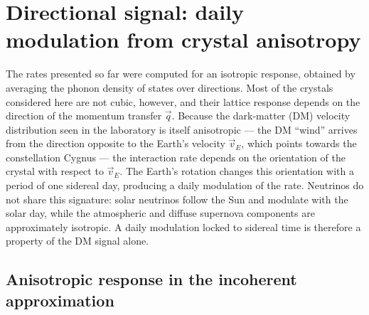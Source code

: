 
\section{Directional signal: daily modulation from crystal anisotropy}
\label{sec:directionality}

The rates presented so far were computed for an isotropic response, obtained by
averaging the phonon density of states over directions. Most of the crystals
considered here are not cubic, however, and their lattice response depends on the
direction of the momentum transfer $\vec q$. Because the dark-matter (DM) velocity
distribution seen in the laboratory is itself anisotropic --- the DM ``wind'' arrives
from the direction opposite to the Earth's velocity $\vec v_E$, which points towards the
constellation Cygnus --- the interaction rate depends on the orientation of the crystal
with respect to $\vec v_E$. The Earth's rotation changes this orientation with a period
of one sidereal day, producing a daily modulation of the rate. Neutrinos do not share
this signature: solar neutrinos follow the Sun and modulate with the solar day, while the
atmospheric and diffuse supernova components are approximately isotropic. A daily
modulation locked to sidereal time is therefore a property of the DM signal alone.

\subsection{Anisotropic response in the incoherent approximation}

